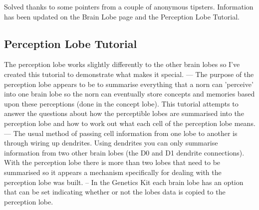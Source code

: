 \documentclass[11pt,twoside,a4paper]{article}
\begin{document}
Solved thanks to some pointers from a couple of anonymous tipsters. Information has been updated on the Brain Lobe page and the Perception Lobe Tutorial. %

\subsection{Perception Lobe Tutorial}

The perception lobe works slightly differently to the other brain lobes so I've created this tutorial to demonstrate what makes it special. --- The purpose of the perception lobe appears to be to summarise everything that a norn can 'perceive' into one brain lobe so the norn can eventually store concepts and memories based upon these perceptions (done in the concept lobe). This tutorial attempts to answer the questions about how the perceptible lobes are summarised into the perception lobe and how to work out what each cell of the perception lobe means. --- The usual method of passing cell information from one lobe to another is through wiring up dendrites. Using dendrites you can only summarise information from two other brain lobes (the D0 and D1 dendrite connections). With the perception lobe there is more than two lobes that need to be summarised so it appears a mechanism specifically for dealing with the perception lobe was built. -- In the Genetics Kit each brain lobe has an option that can be set indicating whether or not the lobes data is copied to the perception lobe.
\end{document}

